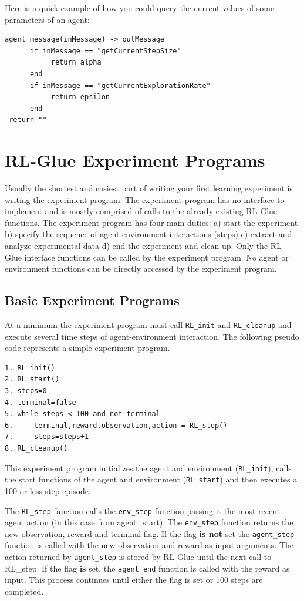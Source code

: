 \documentclass[11pt]{article}
\begin{document}
Here is a quick example of how you could query the current values of some parameters of an agent:
\begin{verbatim}
agent_message(inMessage) -> outMessage
      if inMessage == "getCurrentStepSize"  
           return alpha
      end 
      if inMessage == "getCurrentExplorationRate"  
           return epsilon
      end 
 return ""
\end{verbatim}



\section{RL-Glue Experiment Programs}
\label{exp}
Usually the shortest and easiest part of writing your first learning experiment is writing the experiment program. The experiment program has no interface to implement and is mostly comprised of calls to the already existing RL-Glue functions. The experiment program has four main duties: a) start the experiment b) specify the sequence of agent-environment interactions (steps) c) extract and analyze experimental data d) end the experiment and clean up.  Only the RL-Glue interface functions can be called by the experiment program. No agent or environment functions can be directly accessed by the experiment program.

\subsection{Basic Experiment Programs}
\label{expp1}

At a minimum the experiment program must call \texttt{RL\_init} and \texttt{RL\_cleanup} and execute several time steps of agent-environment interaction. The following pseudo code represents a simple experiment program.
\begin{verbatim}
1. RL_init()
2. RL_start()
3. steps=0
4. terminal=false 
5. while steps < 100 and not terminal
6.     terminal,reward,observation,action = RL_step()
7.     steps=steps+1
8. RL_cleanup()
\end{verbatim}
This experiment program initializes the agent and environment (\texttt{RL\_init}), calls the start functions of the agent and environment (\texttt{RL\_start}) and then executes a 100 or less step episode. 

The \texttt{RL\_step} function calls the \texttt{env\_step} function passing it the most recent agent action (in this case from agent\_start). The \texttt{env\_step} function returns the new observation, reward and terminal flag. If the flag {\bf is not} set the \texttt{agent\_step} function is called with the new observation and reward as input arguments. The action returned by \texttt{agent\_step} is stored by RL-Glue until the next call to RL\_step. If the flag {\bf is} set, the \texttt{agent\_end} function is called with the reward as input. This process continues until either the flag is set or 100 steps are completed. 
\end{document}
